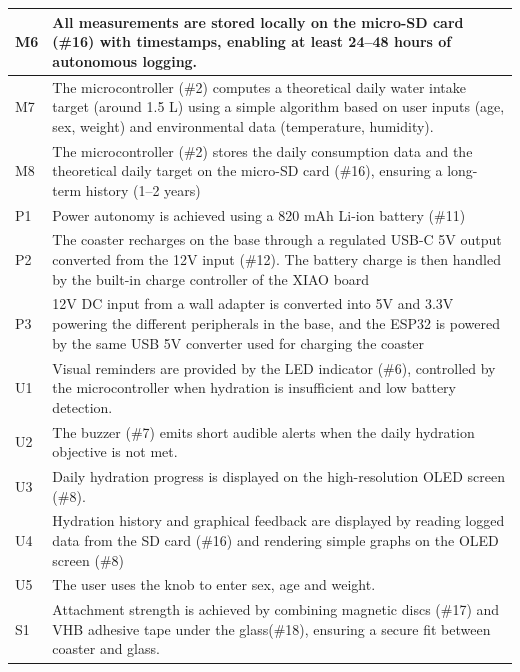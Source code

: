 \documentclass{article}
\begin{document}
\begin{longtable}{|>{\centering\arraybackslash}m{1cm}|>{\arraybackslash}m{14.5cm}|}
M6 & All measurements are stored locally on the micro-SD card (\#16) with timestamps, enabling at least 24–48 hours of autonomous logging. \\
\hline

M7 & The microcontroller (\#2) computes a theoretical daily water intake target (around 1.5 L) using a simple algorithm based on user inputs (age, sex, weight) and environmental data (temperature, humidity). \\
\hline

M8 & The microcontroller (\#2) stores the daily consumption data and the theoretical daily target on the micro-SD card (\#16), ensuring a long-term history (1–2 years)  \\

\hline

P1 & Power autonomy is achieved using a 820 mAh Li-ion battery (\#11)  \\
\hline

P2 & The coaster recharges on the base through a regulated USB-C 5V output converted from the 12V input (\#12). The battery charge is then handled by the built-in charge controller of the XIAO board\\
\hline

P3 & 12V DC input from a wall adapter is converted into 5V and 3.3V powering the different peripherals in the base, and the ESP32 is powered by the same USB 5V converter used for charging the coaster  \\
\hline

U1 & Visual reminders are provided by the LED indicator (\#6), controlled by the microcontroller when hydration is insufficient and low battery detection. \\
\hline

U2 & The buzzer (\#7) emits short audible alerts when the daily hydration objective is not met. \\
\hline

U3 & Daily hydration progress is displayed on the high-resolution OLED screen (\#8). \\
\hline

U4 & Hydration history and graphical feedback are displayed by reading logged data from the SD card (\#16) and rendering simple graphs on the OLED screen (\#8) \\
\hline

U5 & The user uses the knob to enter sex, age and weight. \\
\hline
S1 & Attachment strength is achieved by combining magnetic discs (\#17) and VHB adhesive tape under the glass(\#18), ensuring a secure fit between coaster and glass. \\
\hline


\end{longtable}
\end{document}
